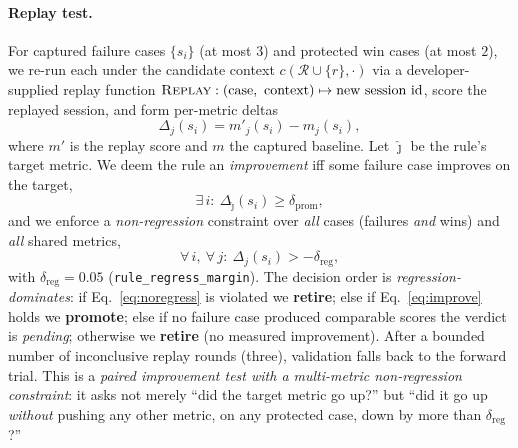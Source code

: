 \documentclass[letterpaper]{article} %
\newcommand{\Rset}{\mathcal{R}}                   %
\newcommand{\dpromote}{\delta_{\mathrm{prom}}}
\newcommand{\dregress}{\delta_{\mathrm{reg}}}
\begin{document}
\paragraph{Replay test.} For captured failure cases $\{s_i\}$ (at most $3$) and protected win
cases (at most $2$), we re-run each under the candidate context $c(\Rset\cup\{r\},\cdot)$ via a
developer-supplied replay function $\textsc{Replay}:(\text{case},\ \text{context})\mapsto
\text{new session id}$, score the replayed session, and form per-metric deltas
\begin{equation}
  \Delta_j(s_i) = m'_j(s_i) - m_j(s_i),
  \label{eq:delta}
\end{equation}
where $m'$ is the replay score and $m$ the captured baseline. Let $\hat{\jmath}$ be the rule's
target metric. We deem the rule an \emph{improvement} iff some failure case improves on the
target,
\begin{equation}
  \exists\, i:\ \Delta_{\hat{\jmath}}(s_i) \ge \dpromote,
  \label{eq:improve}
\end{equation}
and we enforce a \emph{non-regression} constraint over \emph{all} cases (failures \emph{and}
wins) and \emph{all} shared metrics,
\begin{equation}
  \forall\, i,\ \forall\, j:\ \Delta_j(s_i) > -\dregress,
  \label{eq:noregress}
\end{equation}
with $\dregress = 0.05$ (\texttt{rule\_regress\_margin}). The decision order is
\emph{regression-dominates}: if Eq.~\eqref{eq:noregress} is violated we \textbf{retire}; else
if Eq.~\eqref{eq:improve} holds we \textbf{promote}; else if no failure case produced
comparable scores the verdict is \emph{pending}; otherwise we \textbf{retire} (no measured
improvement). After a bounded number of inconclusive replay rounds (three), validation falls
back to the forward trial. This is a \emph{paired improvement test with a multi-metric
non-regression constraint}: it asks not merely ``did the target metric go up?'' but ``did it go
up \emph{without} pushing any other metric, on any protected case, down by more than
$\dregress$?''
\end{document}
